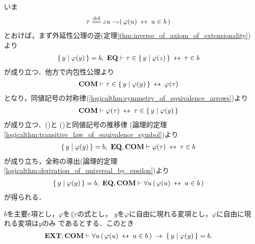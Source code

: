 	\begin{sketch}
		いま
		\begin{align}
			\tau \defeq \varepsilon u \negation (\, \varphi(u) \lrarrow u \in b\, )
		\end{align}
		とおけば，まず外延性公理の逆(定理\ref{thm:inverse_of_axiom_of_extensionality})より
		\begin{align}
			\{\, y \mid \varphi(y)\, \} = b,\ \mbox{{\bf EQ}} \vdash 
			\tau \in \{\, y \mid \varphi(z)\, \} \hspace{0.25em}\leftrightarrow\hspace{0.25em} \tau \in b
			\label{fom:equivalent_formula_rewriting_3_1}
		\end{align}
		が成り立つ．他方で内包性公理より
		\begin{align}
			\mbox{\bf COM} \vdash \tau \in \{\, y \mid \varphi(y)\, \} \hspace{0.25em}\leftrightarrow\hspace{0.25em} \varphi(\tau)
		\end{align}
		となり，同値記号の対称律(\ref{logicalthm:symmetry_of_equivalence_arrows})より
		\begin{align}
			\mbox{\bf COM} \vdash \varphi(\tau) \hspace{0.25em}\leftrightarrow\hspace{0.25em} \tau \in \{\, y \mid \varphi(y)\, \}
			\label{fom:equivalent_formula_rewriting_3_2}
		\end{align}
		が成り立つ．()と
		()と同値記号の推移律
		(論理的定理\ref{logicalthm:transitive_law_of_equivalence_symbol})より
		\begin{align}
			\{\, y \mid \varphi(y)\, \} = b,\ \mbox{{\bf EQ}},\mbox{\bf COM} \vdash 
			\varphi(\tau) \hspace{0.25em}\leftrightarrow\hspace{0.25em} \tau \in b 
		\end{align}
		が成り立ち，全称の導出(論理的定理\ref{logicalthm:derivation_of_universal_by_epsilon})より
		\begin{align}
			\{\, y \mid \varphi(y)\, \} = b,\ \mbox{{\bf EQ}},\mbox{\bf COM} \vdash 
			\forall u\, (\, \varphi(u) \hspace{0.25em}\leftrightarrow\hspace{0.25em} u \in b\, )
		\end{align}
		が得られる．
		\QED
	\end{sketch}
	
	\begin{screen}
		\begin{thm}
		\label{thm:equivalent_formula_rewriting_4}
			$b$を主要$\varepsilon$項とし，$\varphi$を$\lang{\varepsilon}$の式とし，
			$y$を$\varphi$に自由に現れる変項とし，$\varphi$に自由に現れる変項は$y$のみ
			であるとする．このとき
			\begin{align}
				\mbox{{\bf EXT}},\mbox{\bf COM} \vdash \forall u\, (\, \varphi(u) \hspace{0.25em}\leftrightarrow\hspace{0.25em} u \in b\, )
				\hspace{0.25em}\rightarrow\hspace{0.25em} \{\, y \mid \varphi(y)\, \} = b.
			\end{align}
		\end{thm}
	\end{screen}
	
